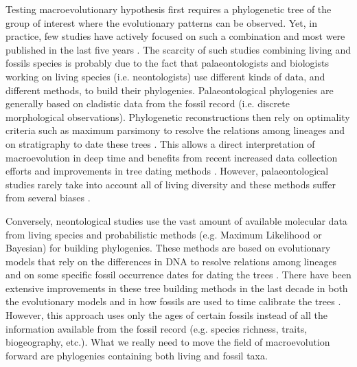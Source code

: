 Testing macroevolutionary hypothesis first requires a phylogenetic tree of the group of interest where the evolutionary patterns can be observed.
Yet, in practice, few studies have actively focused on such a combination and most were published in the last five years \citep[e.g.][]{ronquista2012,slaterphylogenetic2013,Wood01032013,beckancient2014}.
The scarcity of such studies combining living and fossils species is probably due to the fact that palaeontologists and biologists working on living species (i.e. neontologists) %
use different kinds of data, and different methods, to build their phylogenies.
Palaeontological phylogenies are generally based on cladistic data from the fossil record (i.e. discrete morphological observations).
Phylogenetic reconstructions then rely on optimality criteria such as maximum parsimony \citep{Hennig1966,felsenstein2004} to resolve the relations among lineages and on stratigraphy to date these trees \citep{GoloboffTNT}.
This allows a direct interpretation of macroevolution in deep time and benefits from recent increased data collection efforts \citep[e.g. 4541 characters in][introducing the term ``phenomics'']{O'Leary08022013} and improvements in tree dating methods \citep[e.g. the \textit{cal3} method from][]{Bapst2014}.
However, palaeontological studies rarely take into account all of living diversity \citep[e.g. only 38 out of 351 living primates are included with 119 fossils in][]{ni2013oldest} and these methods suffer from several biases \citep[e.g. parsimony;][]{wrightbayesian2014}. %

Conversely, neontological studies use the vast amount of available molecular data from living species and probabilistic methods (e.g. Maximum Likelihood or Bayesian) for building phylogenies.
These methods are based on evolutionary models that rely on the differences in DNA to resolve relations among lineages and on some specific fossil occurrence dates for dating the trees \citep[i.e. the molecular clock;][]{zuckerkandl1965}.
There have been extensive improvements in these tree building methods in the last decade in both the evolutionary models \citep[e.g.][]{bapsta2013,stadlerdating2013,heaththe2013} and in how fossils are used to time calibrate the trees \citep{Donoghue2007424,Parham01032012}.
However, this approach uses only the ages of certain fossils instead of all the information available from the fossil record (e.g. species richness, traits, biogeography, etc.).
What we really need to move the field of macroevolution forward are phylogenies containing both living and fossil taxa.

